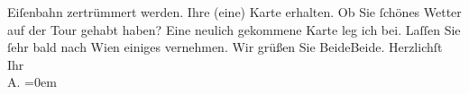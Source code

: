 \begin{ledgroupsized}[t]{13cm}
               Eiſenbahn zer{\pb}trümmert werden. Ihre (eine) Karte
               erhalten. Ob Sie ſchönes Wetter auf der Tour gehabt haben? Eine neulich gekommene
               Karte leg ich bei.\pend
           \pstart
           Laſſen Sie ſehr bald nach Wien einiges
               vernehmen.\pend
           \pstart
           Wir grüßen Sie BeideBeide.\pend
           \pstart
           Herzlichſt Ihr{\\[\baselineskip]}\spacefill\mbox{A.}\pend
           \leftskip=0em{}
         
         \endnumbering{}\end{ledgroupsized}  \newcommand{\dateiname}{L01446}\newcommand{\titel}{Arthur Schnitzler an Hugo von Hofmannsthal, 16. 9. 1904}\newcommand{\editorInnen}{Martin Anton Müller und Gerd-Hermann Susen}
      
